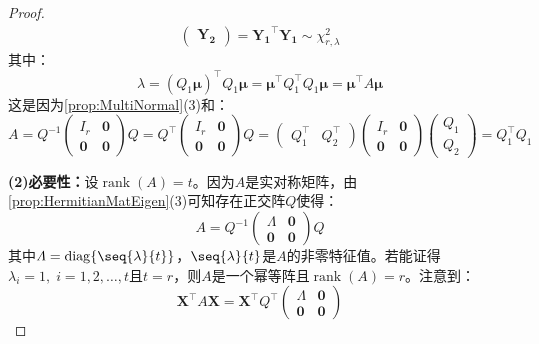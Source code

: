 \begin{proof}
\begin{align*}
\begin{pmatrix}
			\mathbf{Y_2}
		\end{pmatrix}
		=\mathbf{Y_1}^{\top}\mathbf{Y_1}\sim\chi_{r,\lambda}^2
	\end{align*}
	其中：
	\begin{equation*}
		\lambda=(Q_1\boldsymbol{\mu})^{\top}Q_1\boldsymbol{\mu}=\boldsymbol{\mu}^{\top}Q_1^{\top}Q_1\boldsymbol{\mu}=\boldsymbol{\mu}^{\top}A\boldsymbol{\mu}
	\end{equation*}
	这是因为\cref{prop:MultiNormal}(3)和：
	\begin{equation*}
		A=Q^{-1}
		\begin{pmatrix}
			I_r & \mathbf{0} \\
			\mathbf{0} & \mathbf{0}
		\end{pmatrix}Q
		=Q^{\top}
		\begin{pmatrix}
			I_r & \mathbf{0} \\
			\mathbf{0} & \mathbf{0}
		\end{pmatrix}Q
		=
		\begin{pmatrix}
			Q_1^{\top} & Q_2^{\top}
		\end{pmatrix}
			\begin{pmatrix}
			I_r & \mathbf{0} \\
			\mathbf{0} & \mathbf{0}
		\end{pmatrix}
		\begin{pmatrix}
			Q_1 \\
			Q_2
		\end{pmatrix}
		=Q_1^{\top}Q_1
	\end{equation*}\par
	\textbf{(2)必要性：}设$\operatorname{rank}(A)=t$。因为$A$是实对称矩阵，由\cref{prop:HermitianMatEigen}(3)可知存在正交阵$Q$使得：
	\begin{equation*}
		A=Q^{-1}
		\begin{pmatrix}
			\varLambda & \mathbf{0} \\
			\mathbf{0} & \mathbf{0}
		\end{pmatrix}
		Q
	\end{equation*}
	其中$\varLambda=\operatorname{diag}\{\seq{\lambda}{t}\}$，$\seq{\lambda}{t}$是$A$的非零特征值。若能证得$\lambda_i=1,\;i=1,2,\dots,t$且$t=r$，则$A$是一个幂等阵且$\operatorname{rank}(A)=r$。注意到：
	\begin{equation*}
		\mathbf{X}^{\top}A\mathbf{X}=\mathbf{X}^{\top}Q^{\top}
		\begin{pmatrix}
			\varLambda & \mathbf{0} \\
			\mathbf{0} & \mathbf{0}
		\end{pmatrix}

\end{equation*}
\end{proof}

